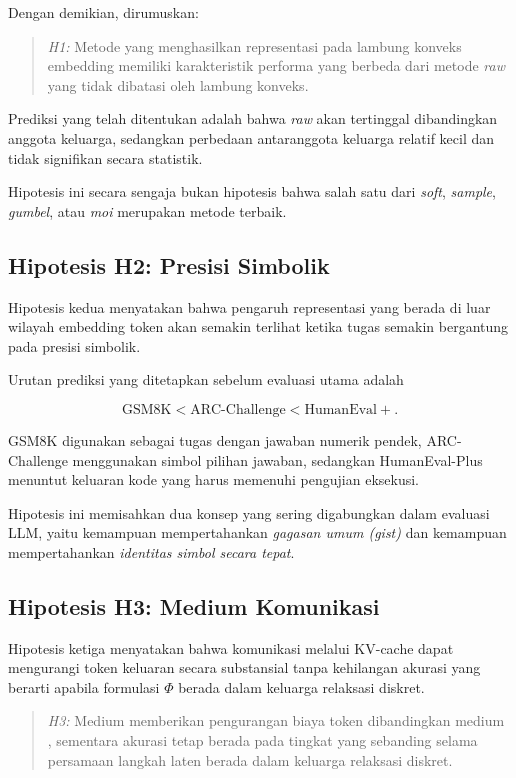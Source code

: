 Dengan demikian, dirumuskan:

\begin{quote}
\textit{H1:} Metode yang menghasilkan representasi pada lambung konveks embedding memiliki karakteristik performa yang berbeda dari metode \textit{raw} yang tidak dibatasi oleh lambung konveks.
\end{quote}

Prediksi yang telah ditentukan adalah bahwa \textit{raw} akan tertinggal dibandingkan anggota keluarga, sedangkan perbedaan antaranggota keluarga relatif kecil dan tidak signifikan secara statistik.

Hipotesis ini secara sengaja bukan hipotesis bahwa salah satu dari \textit{soft}, \textit{sample}, \textit{gumbel}, atau \textit{moi} merupakan metode terbaik.

\subsection{Hipotesis H2: Presisi Simbolik}

Hipotesis kedua menyatakan bahwa pengaruh representasi yang berada di luar wilayah embedding token akan semakin terlihat ketika tugas semakin bergantung pada presisi simbolik.

Urutan prediksi yang ditetapkan sebelum evaluasi utama adalah

\[
\mathrm{GSM8K}
<
\mathrm{ARC\text{-}Challenge}
<
\mathrm{HumanEval+}.
\]

GSM8K digunakan sebagai tugas dengan jawaban numerik pendek, ARC-Challenge menggunakan simbol pilihan jawaban, sedangkan HumanEval-Plus menuntut keluaran kode yang harus memenuhi pengujian eksekusi.

Hipotesis ini memisahkan dua konsep yang sering digabungkan dalam evaluasi LLM, yaitu kemampuan mempertahankan \textit{gagasan umum (\textit{gist})} dan kemampuan mempertahankan \textit{identitas simbol secara tepat}.

\subsection{Hipotesis H3: Medium Komunikasi}

Hipotesis ketiga menyatakan bahwa komunikasi melalui KV-cache dapat mengurangi token keluaran secara substansial tanpa kehilangan akurasi yang berarti apabila formulasi \(\Phi\) berada dalam keluarga relaksasi diskret.

\begin{quote}
\textit{H3:} Medium  memberikan pengurangan biaya token dibandingkan medium , sementara akurasi tetap berada pada tingkat yang sebanding selama persamaan langkah laten berada dalam keluarga relaksasi diskret.
\end{quote}

